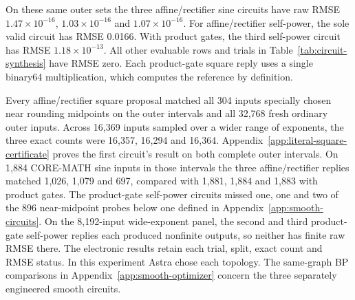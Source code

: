 On these same outer sets the three affine/rectifier sine circuits have raw RMSE $1.47\times10^{-16}$, $1.03\times10^{-16}$ and $1.07\times10^{-16}$. For affine/rectifier self-power, the sole valid circuit has RMSE 0.0166. With product gates, the third self-power circuit has RMSE $1.18\times10^{-13}$. All other evaluable rows and trials in Table~\ref{tab:circuit-synthesis} have RMSE zero. Each product-gate square reply uses a single binary64 multiplication, which computes the reference by definition.

Every affine/rectifier square proposal matched all 304 inputs specially chosen near rounding midpoints on the outer intervals and all 32,768 fresh ordinary outer inputs. Across 16,369 inputs sampled over a wider range of exponents, the three exact counts were 16,357, 16,294 and 16,364. Appendix~\ref{app:literal-square-certificate} proves the first circuit's result on both complete outer intervals. On 1,884 CORE-MATH sine inputs in those intervals the three affine/rectifier replies matched 1,026, 1,079 and 697, compared with 1,881, 1,884 and 1,883 with product gates. The product-gate self-power circuits missed one, one and two of the 896 near-midpoint probes below one defined in Appendix~\ref{app:smooth-circuits}. On the 8,192-input wide-exponent panel, the second and third product-gate self-power replies each produced nonfinite outputs, so neither has finite raw RMSE there. The electronic results retain each trial, split, exact count and RMSE status. In this experiment Astra chose each topology. The same-graph BP comparisons in Appendix~\ref{app:smooth-optimizer} concern the three separately engineered smooth circuits.
